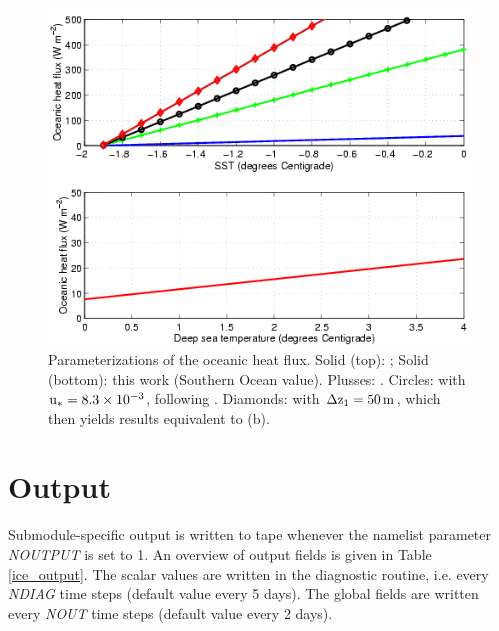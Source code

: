 \begin{figure}[ht]
\includegraphics[width=13cm]{heiko/modules_icemod_flxoc}
\caption[]{Parameterizations of the oceanic heat flux. Solid (top): 
; Solid (bottom): this work (Southern Ocean value). 
Plusses: . Circles:  with
$\rm u_\ast=8.3\times 10^{-3}$, following . Diamonds:
 with $\rm \Delta z_1=50\, m$, which then 
yields results equivalent to (b).}
\label{flxocfig}
\end{figure}

\clearpage

\section*{Output}
Submodule-specific output is written to tape whenever the namelist
parameter {\em NOUTPUT} is set to 1. An overview of output fields is
given in Table \ref{ice_output}. The scalar values are written in the 
diagnostic routine, i.e. every {\em NDIAG} time steps (default value every
5 days). The global fields are written every {\em NOUT} time steps (default
value every 2 days).


